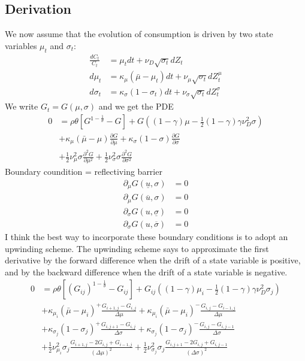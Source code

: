 \documentclass[english]{article}
\begin{document}
\subsection{Derivation}
We now assume that the evolution of consumption is driven by two state variables $\mu_{t}$ and $\sigma_{t}$:
\begin{align*}
	\frac{dC_{t}}{C_{t}} & =  \mu_{t}dt+\nu_{D}\sqrt{\sigma_{t}}dZ_{t}\\
	d\mu_{t} & =  \kappa_{\mu}(\bar{\mu}-\mu_{t})dt+\nu_{\mu}\sqrt{\sigma_{t}}dZ_{t}^{\mu}\\
	d\sigma_{t} & =  \kappa_{\sigma}(1-\sigma_{t})dt+\nu_{\sigma}\sqrt{\sigma_{t}}dZ_{t}^{\sigma}
\end{align*}
We write $G_t = G(\mu, \sigma)$ and we get the PDE
\begin{align*}
	0&= \rho \theta[G^{1-\frac{1}{\theta}}- G]+G((1-\gamma)\mu-\frac{1}{2}(1-\gamma)\gamma\nu_D^2\sigma)\\
	&+ \kappa_{\mu}(\bar{\mu}-\mu)\frac{\partial G}{\partial\mu}+  \kappa_{\sigma}(1-\sigma)\frac{\partial G}{\partial\sigma}\\
	&+\frac{1}{2}\nu_{\mu}^{2}\sigma\frac{\partial^{2}G}{\partial\mu^{2}}+\frac{1}{2}\nu_{\sigma}^{2}\sigma \frac{\partial^{2}G}{\partial\sigma^{2}}
\end{align*}
Boundary coundition  = reflectiving barrier
\begin{align*}
	\partial_\mu G(\underline{u}, \sigma) &= 0  \\
	\partial_\mu G(\overline{u}, \sigma) &= 0 \\
	\partial_\sigma G(u, \underline{\sigma}) &= 0  \\
	\partial_\sigma G(u, \overline{\sigma}) &= 0 
\end{align*}
I think the best way to incorporate these boundary conditions is to adopt an upwinding scheme. The upwinding scheme says to approximate the first derivative by the forward difference when the drift of a state variable is positive, and by the backward difference when the drift of a state variable is negative.
\begin{align*}
	0&= \rho \theta[(G_{ij})^{1-\frac{1}{\theta}}- G_{ij}]+G_{ij}((1-\gamma)\mu_i-\frac{1}{2}(1-\gamma)\gamma\nu_D^2\sigma_j)\\
	&+\kappa_{\mu_i}(\bar{\mu}-\mu_i)^+\frac{G_{i+1, j}-G_{i, j}}{\Delta \mu} +\kappa_{\mu_i}(\bar{\mu}-\mu_i)^-\frac{G_{i, j}-G_{i-1, j}}{\Delta \mu}\\
	&+\kappa_{\sigma_j}(1-\sigma_j)^+\frac{G_{i, j+1}-G_{i,j}}{\Delta \sigma} +\kappa_{\sigma_j}(1-\sigma_j)^-\frac{G_{i, j}-G_{i,j-1}}{\Delta \sigma}\\
	&+\frac{1}{2}\nu_{\mu_i}^{2}\sigma_j\frac{G_{i+1, j} - 2 G_{i, j} + G_{i-1, j}}{(\Delta\mu)^2}+\frac{1}{2}\nu_{\sigma_j}^{2}\sigma_j\frac{G_{i, j+1} - 2 G_{i, j} + G_{i, j-1}}{(\Delta\sigma)^2}
\end{align*}
\end{document}
